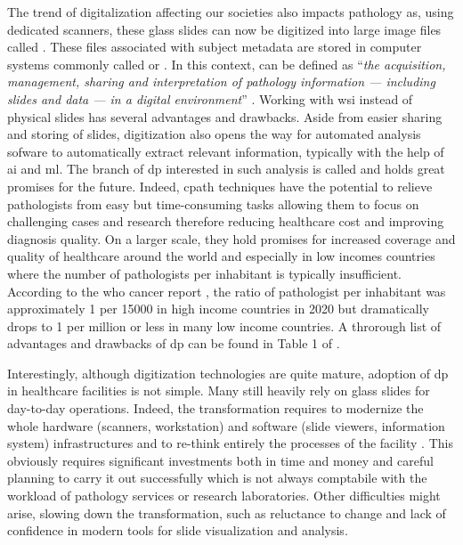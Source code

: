 The trend of digitalization affecting our societies also impacts pathology as, using dedicated scanners, these glass slides can now be digitized into large image files called . These files associated with subject metadata are stored in computer systems commonly called  or . In this context,  can be defined as ``\textit{the acquisition, management, sharing and interpretation of pathology information — including slides and data — in a digital environment}'' \parencite{doolan2019whatisdp}. Working with \acrshort{wsi} instead of physical slides has several advantages and drawbacks. Aside from easier sharing and storing of slides, digitization also opens the way for automated analysis sofware to automatically extract relevant information, typically with the help of \acrlong{ai} and \acrlong{ml}. The branch of \acrlong{dp} interested in such analysis is called  and holds great promises for the future. Indeed, \acrlong{cpath} techniques have the potential to relieve pathologists from easy but time-consuming tasks allowing them to focus on challenging cases and research therefore reducing healthcare cost and improving diagnosis quality. On a larger scale, they hold promises for increased coverage and quality of healthcare around the world and especially in low incomes countries where the number of pathologists per inhabitant is typically insufficient. According to the \acrshort{who} cancer report \parencite{world2020report}, the ratio of pathologist per inhabitant was approximately 1 per 15000 in high income countries in 2020 but dramatically drops to 1 per million or less in many low income countries. A throrough list of advantages and drawbacks of \acrlong{dp} can be found in Table 1 of \parencite{jahn2020digital}.

Interestingly, although digitization technologies are quite mature, adoption of \acrlong{dp} in healthcare facilities is not simple. Many still heavily rely on glass slides for day-to-day operations. Indeed, the transformation requires to modernize the whole hardware (scanners, workstation) and software (slide viewers, information system) infrastructures and to re-think entirely the processes of the facility \parencite{temprana2022digipatics}. This obviously requires significant investments both in time and money and careful planning to carry it out successfully which is not always comptabile with the workload of pathology services or research laboratories. Other difficulties might arise, slowing down the transformation, such as reluctance to change and lack of confidence in modern tools for slide visualization and analysis. 

